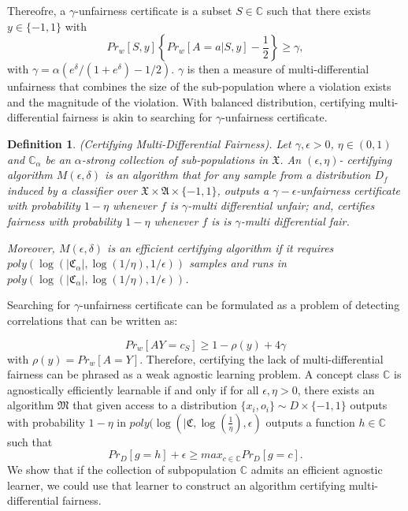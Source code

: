 \documentclass{article}
\newtheorem{defn}{Definition}[section]
\begin{document}
Thereofre, a $\gamma$-unfairness certificate is a subset $S\in \mathbb{C}$ such that there exists $y\in \{-1, 1\}$ with
\begin{equation}
    Pr_{w}[S, y]\left\{Pr_{w}[A=a |S, y] -\frac{1}{2}\right\}\geq \gamma,
\end{equation}
with $\gamma =\alpha \left(e^{\delta}/(1+e^{\delta})-1/2\right)$. $\gamma$ is then a measure of multi-differential unfairness that combines the size of the sub-population where a violation exists and the magnitude of the violation. With balanced distribution, certifying multi-differential fairness is akin to searching for $\gamma$-unfairness certificate. 

\begin{defn}(Certifying Multi-Differential Fairness). 
Let $\gamma, \epsilon >0$, $\eta\in (0, 1)$ and $\mathbb{C}_{\alpha}$ be an $\alpha$-strong collection of sub-populations in $\mathfrak{X}$. An $(\epsilon, \eta)$- certifying algorithm $M(\epsilon, \delta)$ is an algorithm that for any sample from a distribution $D_{f}$ induced by a classifier over $\mathfrak{X} \times \mathfrak{A}\times \{-1, 1\}$, outputs a $\gamma-\epsilon$-unfairness certificate with probability $1-\eta$ whenever $f$ is $ \gamma$-multi differential unfair; and, certifies fairness with probability $1-\eta$ whenever $f$ is is $\gamma$-multi differential fair. 

\bigskip
Moreover, $M(\epsilon, \delta)$ is an efficient certifying algorithm if it requires $poly(\log(|\mathfrak{C}_{\alpha}|, \log(1/\eta), 1/\epsilon))$ samples and runs in $poly(\log(|\mathfrak{C}_{\alpha}|, \log(1/\eta), 1/\epsilon))$. 
\end{defn}

Searching for $\gamma$-unfairness certificate can be formulated as a problem of detecting correlations that can be written as:

\begin{equation}
Pr_{w}[AY=c_{S}] \geq 1 - \rho(y) + 4\gamma
\end{equation}
with $\rho(y)=Pr_{w}[A=Y]$. Therefore, certifying the lack of multi-differential fairness can be phrased as a weak agnostic learning problem. A concept class $\mathbb{C}$ is agnostically efficiently learnable if and only if for all $\epsilon, \eta >0$, there exists an algorithm $\mathfrak{M}$ that given access to a distribution $\{x_{i}, o_{i}\}\sim D\times \{-1, 1\}$ outputs with probability $1-\eta$ in $poly(\log(|\mathfrak{C}, \log(\frac{1}{\eta}), \epsilon)$ outputs  a function $h\in \mathbb{C}$ such that
$$ Pr_{D}[g=h]  + \epsilon \geq max_{c\in \mathbb{C}}Pr_{D}[g=c]. $$
We show that if the collection of subpopulation $\mathbb{C}$ admits an efficient agnostic learner, we could use that learner to construct an algorithm certifying multi-differential fairness.
\end{document}
